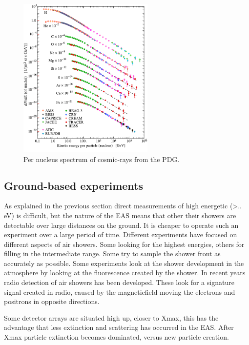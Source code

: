 \begin{figure}
    \centering
    \includegraphics[width=0.6\textwidth]
                    {plots/cosmic-rays/PDG_28_1_fluxes_per_nucleus}
    \caption{Per nucleus spectrum of cosmic-rays from the PDG.}
    \label{fig:low_e_spectrum}
\end{figure}


\subsection{Ground-based experiments}

As explained in the previous section direct measurements of high energetic (>.. eV) is difficult, but the nature of the EAS means that other their showers are detectable over large distances on the ground. It is cheaper to operate such an experiment over a large period of time. Different experiments have focused on different aspects of air showers. Some looking for the highest energies, others for filling in the intermediate range. Some try to sample the shower front as accurately as possible. Some experiments look at the shower development in the atmosphere by looking at the fluorescence created by the shower. In recent years radio detection of air showers has been developed. These look for a signature signal created in radio, caused by the magneticfield moving the electrons and positrons in opposite directions.

Some detector arrays are situated high up, closer to Xmax, this has the advantage that less extinction and scattering has occurred in the EAS. After Xmax particle extinction becomes dominated, versus new particle creation. 

